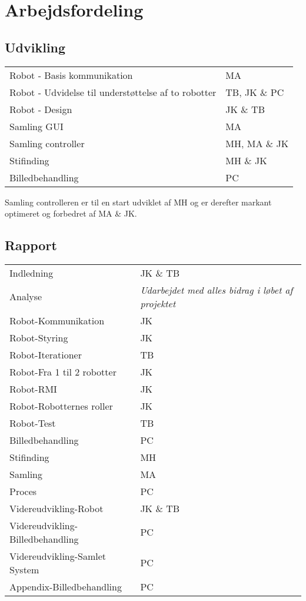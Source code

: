 \chapter{Arbejdsfordeling}\label{app:whodidwhat}
\section*{Udvikling}
\begin{tabular}{l l}
    Robot - Basis kommunikation & MA\\
    Robot - Udvidelse til understøttelse af to robotter & TB, JK \& PC\\
    Robot - Design & JK \& TB\\
    Samling GUI & MA\\
    Samling controller & MH, MA \& JK\\
    Stifinding & MH \& JK\\
    Billedbehandling & PC\\
\end{tabular}

Samling controlleren er til en start udviklet af MH og er derefter markant optimeret og forbedret af MA \& JK.

\section*{Rapport}
\begin{tabular}{l l}
	Indledning & JK \& TB \\
	Analyse & \textit{Udarbejdet med alles bidrag i løbet af projektet} \\
	Robot-Kommunikation & JK \\
	Robot-Styring & JK \\
	Robot-Iterationer & TB \\
	Robot-Fra 1 til 2 robotter & JK \\
	Robot-RMI & JK \\
	Robot-Robotternes roller & JK \\
	Robot-Test & TB \\
	Billedbehandling & PC \\
	Stifinding & MH \\
	Samling & MA \\
	Proces & PC \\
	Videreudvikling-Robot & JK \& TB \\
	Videreudvikling-Billedbehandling & PC \\
	Videreudvikling-Samlet System & PC \\
	Appendix-Billedbehandling & PC
\end{tabular}